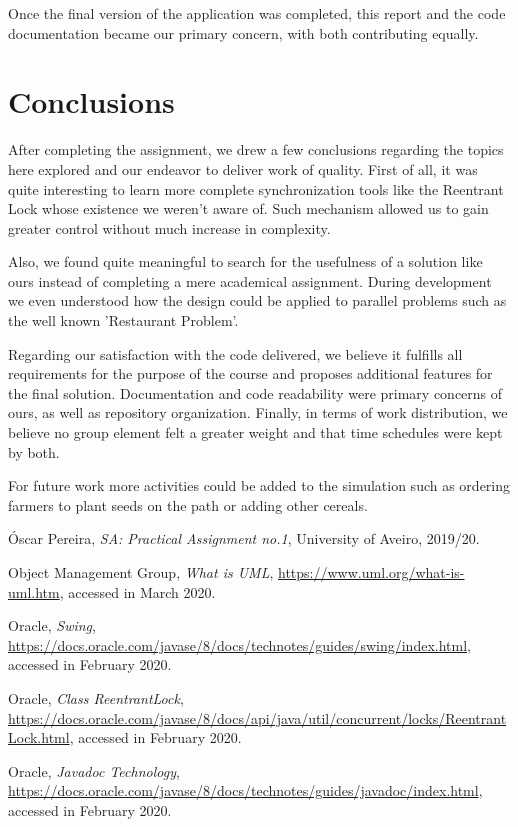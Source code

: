\documentclass[12pt]{article}
\begin{document}
Once the final version of the application was completed, this report and the code documentation became our primary concern, with both contributing equally.

\newpage
\section{Conclusions} %

After completing the assignment, we drew a few conclusions regarding the topics here explored and our endeavor to deliver work of quality.
First of all, it was quite interesting to learn more complete synchronization tools like the Reentrant Lock whose existence we weren't aware of.
Such mechanism allowed us to gain greater control without much increase in complexity.

Also, we found quite meaningful to search for the usefulness of a solution like ours instead of completing a mere academical assignment.
During development we even understood how the design could be applied to parallel problems such as the well known 'Restaurant Problem'.

Regarding our satisfaction with the code delivered, we believe it fulfills all requirements for the purpose of the course and proposes additional features for 
the final solution.
Documentation and code readability were primary concerns of ours, as well as repository organization.
Finally, in terms of work distribution, we believe no group element felt a greater weight and that time schedules were kept by both.

For future work more activities could be added to the simulation such as ordering farmers to plant seeds on the path or adding other cereals.

\begin{thebibliography}{9} %
  

    Óscar Pereira,
    \textit{SA: Practical Assignment no.1},
    University of Aveiro,
    2019/20.

    Object Management Group,
    \textit{What is UML},
    \url{https://www.uml.org/what-is-uml.htm},
    accessed in March 2020.

    Oracle,
    \textit{Swing},
    \url{https://docs.oracle.com/javase/8/docs/technotes/guides/swing/index.html},
    accessed in February 2020.

    Oracle,
    \textit{Class ReentrantLock},
    \url{https://docs.oracle.com/javase/8/docs/api/java/util/concurrent/locks/ReentrantLock.html},
    accessed in February 2020.
    
    Oracle,
    \textit{Javadoc Technology},
    \url{https://docs.oracle.com/javase/8/docs/technotes/guides/javadoc/index.html},
    accessed in February 2020.

\end{thebibliography}

\clearpage
\end{document}
